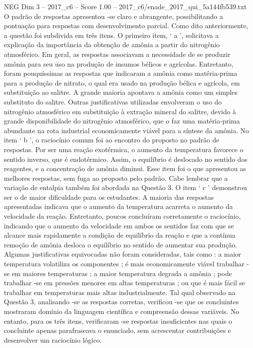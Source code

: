 \begin{textsample}{NEG Dim 3 – 2017\_c6 – Score 1.00 – 2017\_c6/enade\_2017\_qui\_5a144fb539.txt}
O padrão de respostas apresentou -se claro e abrangente, possibilitando a pontuação para respostas com desenvolvimento parcial.
Como dito anteriormente, a questão foi subdivida em três itens.
O primeiro item, ‘ a ’, solicitava a explicação da importância da obtenção de amônia a partir do nitrogênio atmosférico.
Em geral, as respostas associavam a necessidade de se produzir amônia para seu uso na produção de insumos bélicos e agrícolas.
Entretanto, foram pouquíssimas as respostas que indicaram a amônia como matéria-prima para a produção de nitrato, o qual era usado na produção bélica e agrícola, em substituição ao salitre.
A grande maioria apontava a amônia como um simples substituto do salitre.
Outras justificativas utilizadas envolveram o uso do nitrogênio atmosférico em substituição à extração mineral do salitre, devido à grande disponibilidade do nitrogênio atmosférico, que o faz uma matéria-prima abundante na rota industrial economicamente viável para a síntese da amônia.
No item ‘ b ’, o raciocínio comum foi ao encontro do proposto no padrão de respostas.
Por ser uma reação exotérmica, o aumento da temperatura favorece o sentido inverso, que é endotérmico.
Assim, o equilíbrio é deslocado no sentido dos reagentes, e a concentração de amônia diminui.
Esse item foi o que apresentou as melhores respostas, sem fuga ao proposto pelo padrão.
Cabe lembrar que a variação de entalpia também foi abordada na Questão 3.
O item ‘ c ’ demonstrou ser o de maior dificuldade para os estudantes.
A maioria das respostas apresentadas indicava que o aumento da temperatura acarreta o aumento da velocidade da reação.
Entretanto, poucos concluíram corretamente o raciocínio, indicando que o aumento da velocidade em ambos os sentidos faz com que se alcance mais rapidamente a condição de equilíbrio da reação e que a contínua remoção de amônia desloca o equilíbrio no sentido de aumentar sua produção.
Algumas justificativas equivocadas não foram consideradas, tais como : a maior temperatura volatiliza os componentes ; é mais economicamente viável trabalhar -se em maiores temperaturas ; a maior temperatura degrada a amônia ; pode trabalhar -se em pressões menores em altas temperaturas ; ou que é mais fácil se trabalhar em temperaturas mais altas industrialmente.
Tal qual observado na Questão 3, analisando -se as respostas corretas, verificou -se que os concluintes mostraram domínio da linguagem científica e compreensão dessas variáveis.
No entanto, para os três itens, verificaram -se respostas insuficientes nas quais o concluinte apenas parafraseava o enunciado, sem acrescentar contribuições e desenvolver um raciocínio lógico.

\end{textsample}

